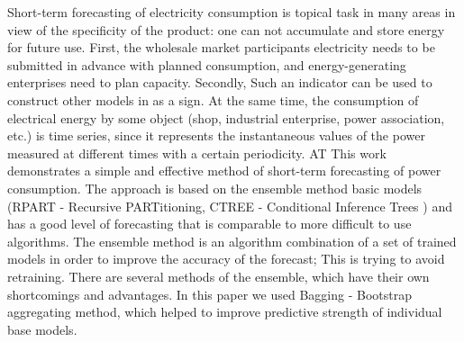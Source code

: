 \documentclass[60x84/16,8pt]{ittmm}
\begin{document}





\begin{altabstract}
Short-term forecasting of electricity consumption is topical task in many areas
in view of the specificity of the product: one can not accumulate and store
energy for future use. First, the wholesale market participants electricity
needs to be submitted in advance with planned consumption, and energy-generating
enterprises need to plan capacity. Secondly, Such an indicator can be used to
construct other models in as a sign. At the same time, the consumption of
electrical energy by some object (shop, industrial enterprise, power
association, etc.) is time series, since it represents the instantaneous values
​​of the power measured at different times with a certain periodicity. AT This
work demonstrates a simple and effective method of short-term forecasting of
power consumption. The approach is based on the ensemble method basic models
(RPART - Recursive PARTitioning, CTREE - Conditional Inference Trees
\cite{BreimanEtAl}) and has a good level of forecasting that is comparable to
more difficult to use algorithms. The ensemble method is an algorithm
combination of a set of trained models in order to improve the accuracy of the
forecast; This is trying to avoid retraining. There are several methods of the
ensemble, which have their own shortcomings and advantages. In this paper we
used Bagging - Bootstrap aggregating method, which helped to improve predictive
strength of individual base models.
\end{altabstract}
\end{document}
